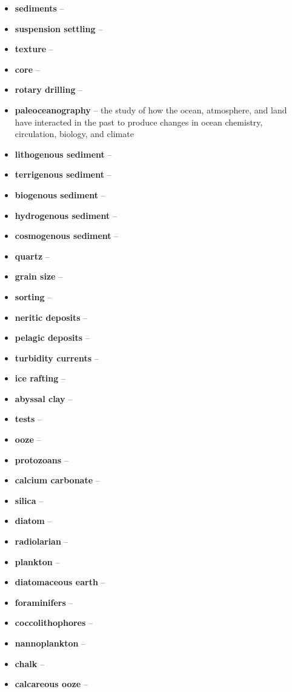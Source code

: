 \begin{itemize}
	\item \textbf{sediments} -- 
	\item \textbf{suspension settling} -- 
	\item \textbf{texture} -- 
	\item \textbf{core} -- 
	\item \textbf{rotary drilling} -- 
	\item \textbf{paleoceanography} -- the study of how the ocean,
		atmosphere, and land have interacted in the past to produce
		changes in ocean chemistry, circulation, biology, and climate
	\item \textbf{lithogenous sediment} -- 
	\item \textbf{terrigenous sediment} -- 
	\item \textbf{biogenous sediment} -- 
	\item \textbf{hydrogenous sediment} -- 
	\item \textbf{cosmogenous sediment} -- 
	\item \textbf{quartz} -- 
	\item \textbf{grain size} -- 
	\item \textbf{sorting} -- 
	\item \textbf{neritic deposits} -- 
	\item \textbf{pelagic deposits} -- 
	\item \textbf{turbidity currents} -- 
	\item \textbf{ice rafting} -- 
	\item \textbf{abyssal clay} -- 
	\item \textbf{tests} -- 
	\item \textbf{ooze} -- 
	\item \textbf{protozoans} -- 
	\item \textbf{calcium carbonate} -- 
	\item \textbf{silica} -- 
	\item \textbf{diatom} -- 
	\item \textbf{radiolarian} -- 
	\item \textbf{plankton} -- 
	\item \textbf{diatomaceous earth} -- 
	\item \textbf{foraminifers} -- 
	\item \textbf{coccolithophores} -- 
	\item \textbf{nannoplankton} -- 
	\item \textbf{chalk} -- 
	\item \textbf{calcareous ooze} -- 

\end{itemize}

